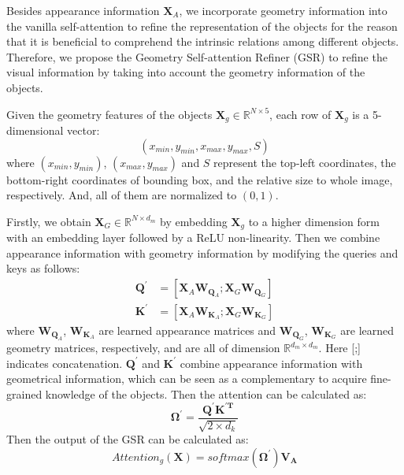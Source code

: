 \documentclass[review]{elsarticle}
\begin{document}
Besides appearance information \(\bm{X}_A\), we incorporate geometry information into the vanilla self-attention to refine the representation of the objects for the reason that it is beneficial to comprehend the intrinsic relations among different objects. Therefore, we propose the Geometry Self-attention Refiner (GSR) to refine the visual information by taking into account the geometry information of the objects.

Given the geometry features of the objects \(\bm{X}_g \in \mathbb{R}^{N \times 5}\), each row of \(\bm{X}_g\) is a 5-dimensional vector:
\begin{equation}
  (x_{min}, y_{min}, x_{max}, y_{max}, S)
\end{equation}
where \((x_{min}, y_{min})\), \((x_{max}, y_{max})\) and \(S\) represent the top-left coordinates, the bottom-right coordinates of bounding box, and the relative size to whole image, respectively. And, all of them  are normalized to $(0, 1)$.

Firstly, we obtain \(\bm{X}_{G}\in \mathbb{R}^{N \times d_m}\) by embedding \(\bm{X}_{g}\) to a higher dimension form with an embedding layer followed by a ReLU non-linearity. Then we combine appearance information with geometry information by modifying the queries and keys as follows:
\begin{align}
  \bm{Q^{'}} & = [\bm{X}_A\bm{W}_{\bm{Q}_A}; \bm{X}_G\bm{W}_{\bm{Q}_G}] \\
  \bm{K^{'}} & = [\bm{X}_A\bm{W}_{\bm{K}_A}; \bm{X}_G\bm{W}_{\bm{K}_G}]
\end{align}
where \(\bm{W}_{\bm{Q}_A}\), \(\bm{W}_{\bm{K}_A}\) are learned appearance matrices and  \(\bm{W}_{\bm{Q}_G}\), \(\bm{W}_{\bm{K}_G}\) are learned geometry matrices, respectively, and are all of dimension \(\mathbb{R}^{d_{m} \times d_{m}}\). Here [;]  indicates concatenation. \(\bm{Q^{'}}\) and \(\bm{K^{'}}\) combine appearance information with geometrical information, which can be seen as a complementary to acquire  fine-grained knowledge of the objects. Then the attention can be calculated as:
\begin{equation}
  \bm{\Omega^{'}} = \frac{\bm{Q^{'}K^{'T}}}{\sqrt{2 \times d_k}}
\end{equation}
Then the output of the GSR can be calculated as:
\begin{equation}
  { Attention_{g}}(\bm{X}) = { softmax} (\bm{\Omega^{'}})\bm{V_A}
\end{equation}
\end{document}
